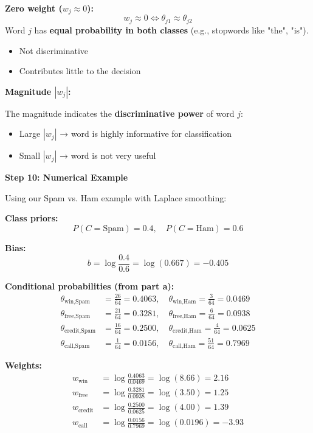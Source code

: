 \documentclass[12pt]{article}
\begin{document}
\begin{solution}
\textbf{Zero weight ($w_j \approx 0$):}
\[
w_j \approx 0 \iff \theta_{j1} \approx \theta_{j2}
\]
Word $j$ has \textbf{equal probability in both classes} (e.g., stopwords like "the", "is").
\begin{itemize}
    \item Not discriminative
    \item Contributes little to the decision
\end{itemize}

\textbf{Magnitude $|w_j|$:}

The magnitude indicates the \textbf{discriminative power} of word $j$:
\begin{itemize}
    \item Large $|w_j|$ → word is highly informative for classification
    \item Small $|w_j|$ → word is not very useful
\end{itemize}

\textbf{Step 10: Numerical Example}

Using our Spam vs. Ham example with Laplace smoothing:

\textbf{Class priors:}
\[
P(C = \text{Spam}) = 0.4, \quad P(C = \text{Ham}) = 0.6
\]

\textbf{Bias:}
\[
b = \log \frac{0.4}{0.6} = \log(0.667) = -0.405
\]

\textbf{Conditional probabilities (from part a):}
\begin{align*}
\theta_{\text{win}, \text{Spam}} &= \frac{26}{64} = 0.4063, \quad \theta_{\text{win}, \text{Ham}} = \frac{3}{64} = 0.0469 \\
\theta_{\text{free}, \text{Spam}} &= \frac{21}{64} = 0.3281, \quad \theta_{\text{free}, \text{Ham}} = \frac{6}{64} = 0.0938 \\
\theta_{\text{credit}, \text{Spam}} &= \frac{16}{64} = 0.2500, \quad \theta_{\text{credit}, \text{Ham}} = \frac{4}{64} = 0.0625 \\
\theta_{\text{call}, \text{Spam}} &= \frac{1}{64} = 0.0156, \quad \theta_{\text{call}, \text{Ham}} = \frac{51}{64} = 0.7969
\end{align*}

\textbf{Weights:}
\begin{align*}
w_{\text{win}} &= \log \frac{0.4063}{0.0469} = \log(8.66) = 2.16 \\
w_{\text{free}} &= \log \frac{0.3281}{0.0938} = \log(3.50) = 1.25 \\
w_{\text{credit}} &= \log \frac{0.2500}{0.0625} = \log(4.00) = 1.39 \\
w_{\text{call}} &= \log \frac{0.0156}{0.7969} = \log(0.0196) = -3.93
\end{align*}


\end{solution}
\end{document}
